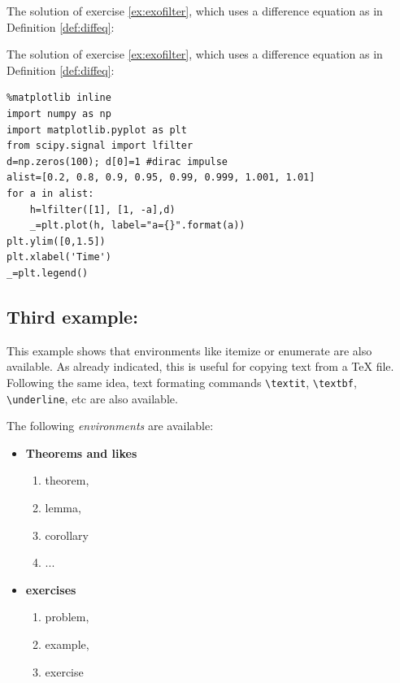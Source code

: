     \begin{listing}
The solution of exercise \ref{ex:exofilter}, which uses a difference equation as in Definition \ref{def:diffeq}:
\end{listing}

The solution of exercise \ref{ex:exofilter}, which uses a difference
equation as in Definition \ref{def:diffeq}:
\begin{lstlisting}
%matplotlib inline
import numpy as np
import matplotlib.pyplot as plt 
from scipy.signal import lfilter
d=np.zeros(100); d[0]=1 #dirac impulse
alist=[0.2, 0.8, 0.9, 0.95, 0.99, 0.999, 1.001, 1.01]
for a in alist:
    h=lfilter([1], [1, -a],d)
    _=plt.plot(h, label="a={}".format(a))
plt.ylim([0,1.5])
plt.xlabel('Time')
_=plt.legend()
\end{lstlisting}%
%
    \begin{center}
    \end{center}
    
    \subsection{Third example:}\label{third-example}

    This example shows that environments like itemize or enumerate are also
available. As already indicated, this is useful for copying text from a
TeX file. Following the same idea, text formating commands
\texttt{\textbackslash{}textit}, \texttt{\textbackslash{}textbf},
\texttt{\textbackslash{}underline}, etc are also available.

    \begin{listing}
The following \textit{environments} are available:
\begin{itemize}
    \item \textbf{Theorems and likes}
    \begin{enumerate}
        \item theorem,
        \item lemma,
        \item corollary
        \item ...
    \end{enumerate}
    \item \textbf{exercises}
    \begin{enumerate}
        \item problem,
        \item example,
        \item exercise
    \end{enumerate}
\end{itemize}
\end{listing}

